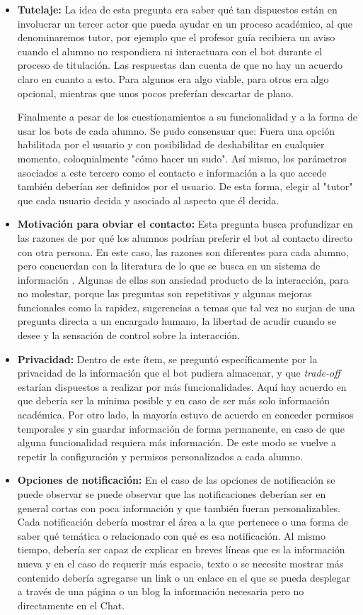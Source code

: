 \begin{itemize}
        \item \textbf{Tutelaje:} La idea de esta pregunta era saber qué tan dispuestos están en involucrar un tercer actor que pueda ayudar en un proceso académico, al que denominaremos tutor, por ejemplo que el profesor guía recibiera un aviso cuando el alumno no respondiera ni interactuara con el bot durante el proceso de titulación. Las respuestas dan cuenta de que no hay un acuerdo claro en cuanto a esto. Para algunos era algo viable, para otros era algo opcional, mientras que unos pocos preferían descartar de plano.
        \par Finalmente a pesar de los cuestionamientos a su funcionalidad y a la forma de usar los bots de cada alumno. Se pudo consensuar que: Fuera una opción habilitada por el usuario y con posibilidad de deshabilitar en cualquier momento, coloquialmente "cómo hacer un sudo". Así mismo, los parámetros asociados a este tercero como el contacto e información a la que accede también deberían ser definidos por el usuario. De esta forma, elegir al "tutor" que cada usuario decida y asociado al aspecto que él decida.
        \item \textbf{Motivación para obviar el contacto:} Esta pregunta busca profundizar en las razones de por qué los alumnos podrían preferir el bot al contacto directo con otra persona. En este caso, las razones son diferentes para cada alumno, pero concuerdan con la literatura de lo que se busca en un sistema de información \cite{Thurman}. Algunas de ellas son ansiedad producto de la interacción, para no molestar, porque las preguntas son repetitivas y algunas mejoras funcionales como la rapidez, sugerencias a temas que tal vez no surjan de una pregunta directa a un encargado humano, la libertad de acudir cuando se desee y la sensación de control sobre la interacción.
        \item \textbf{Privacidad:} Dentro de este ítem, se preguntó específicamente por la privacidad de la información que el bot pudiera almacenar, y que \textit{trade-off} estarían dispuestos a realizar por más funcionalidades. Aquí hay acuerdo en que debería ser la mínima posible y en caso de ser más solo información académica. Por otro lado, la mayoría estuvo de acuerdo en conceder permisos temporales y sin guardar información de forma permanente, en caso de que alguna funcionalidad requiera más información. De este modo se vuelve a repetir la configuración y permisos personalizados a cada alumno.
        
        \item \textbf{Opciones de notificación:} En el caso de las opciones de notificación se puede observar se puede observar que las notificaciones deberían ser en general cortas con poca información y que también fueran personalizables. Cada notificación debería mostrar el área a la que pertenece o una forma de saber qué temática o relacionado con qué es esa notificación. Al mismo tiempo, debería ser capaz de explicar en breves líneas que es la información nueva y en el caso de requerir más espacio, texto o se necesite mostrar más contenido debería agregarse un link o un enlace en el que se pueda desplegar a través de una página o un blog la información necesaria pero no directamente en el Chat.
    \end{itemize}
